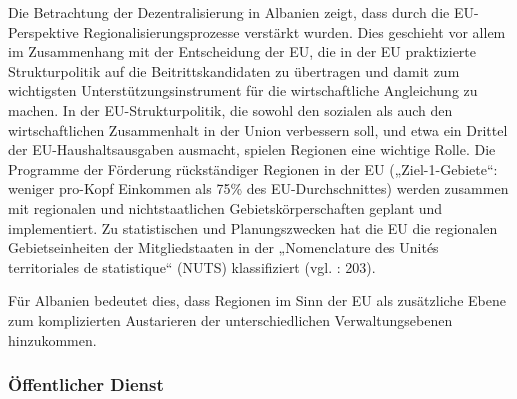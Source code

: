 Die Betrachtung der Dezentralisierung in Albanien zeigt, dass durch die EU-Perspektive Regionalisierungsprozesse verstärkt wurden. Dies geschieht vor allem im Zusammenhang mit der Entscheidung der EU, die in der EU praktizierte Strukturpolitik auf die Beitrittskandidaten zu übertragen und damit zum wichtigsten Unterstützungsinstrument für die wirtschaftliche Angleichung zu machen. In der EU-Strukturpolitik, die sowohl den sozialen als auch den wirtschaftlichen Zusammenhalt in der Union verbessern soll, und etwa ein Drittel der EU-Haushaltsausgaben ausmacht, spielen Regionen eine wichtige Rolle. Die Programme der Förderung rückständiger Regionen in der EU („Ziel-1-Gebiete“: weniger pro-Kopf Einkommen als 75\% des EU-Durchschnittes) werden zusammen mit regionalen und nichtstaatlichen Gebietskörperschaften geplant und implementiert. Zu statistischen und Planungszwecken hat die EU die regionalen Gebietseinheiten der Mitgliedstaaten in der „Nomenclature des Unités territoriales de statistique“ (NUTS) klassifiziert (vgl. \cite{brusis09}: 203).\par
Für Albanien bedeutet dies, dass Regionen im Sinn der EU als zusätzliche Ebene zum komplizierten Austarieren der unterschiedlichen Verwaltungsebenen hinzukommen.
\subsubsection{Öffentlicher Dienst} 

